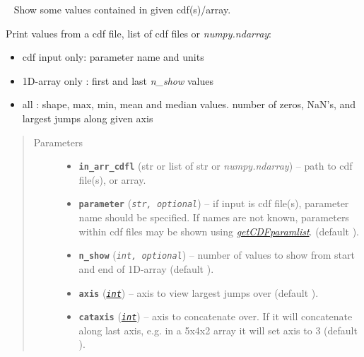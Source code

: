 \documentclass[letterpaper,10pt,english]{sphinxhowto}
\begin{document}
\begin{fulllineitems}
\label{swtools_doc:swtools.param_peek}~\label{swtools_doc:param-peek}
Show some values contained in given cdf(s)/array.

Print values from a cdf file, list of cdf files or \emph{numpy.ndarray}:
\begin{itemize}
\item {} 
cdf input only: parameter name and units

\item {} 
1D-array only :  first and last \emph{n\_show} values

\item {} 
all : shape, max, min, mean and median values.
number of zeros, NaN's, and largest jumps along given axis

\end{itemize}
\begin{quote}\begin{description}
\item[{Parameters}] \leavevmode\begin{itemize}
\item {} 
\textbf{\texttt{in\_arr\_cdfl}} (str or list of str or \emph{numpy.ndarray}) -- path to cdf file(s), or array.

\item {} 
\textbf{\texttt{parameter}} (\emph{\texttt{str, optional}}) -- if input is cdf file(s), parameter name should be specified. If
names are not known, parameters within cdf files may be shown
using {\hyperref[swtools_doc:getcdfparamlist]{\emph{getCDFparamlist}}}. (default ).

\item {} 
\textbf{\texttt{n\_show}} (\emph{\texttt{int, optional}}) -- number of values to show from start and end of 1D-array
(default ).

\item {} 
\textbf{\texttt{axis}} (\href{https://docs.python.org/library/functions.html\#int}{\emph{\texttt{int}}}) -- axis to view largest jumps over (default ).

\item {} 
\textbf{\texttt{cataxis}} (\href{https://docs.python.org/library/functions.html\#int}{\emph{\texttt{int}}}) -- axis to concatenate over. If  it will concatenate
along last axis, e.g. in a 5x4x2 array it will set axis to 3
(default ).

\end{itemize}

\end{description}\end{quote}

\end{fulllineitems}
\end{document}
